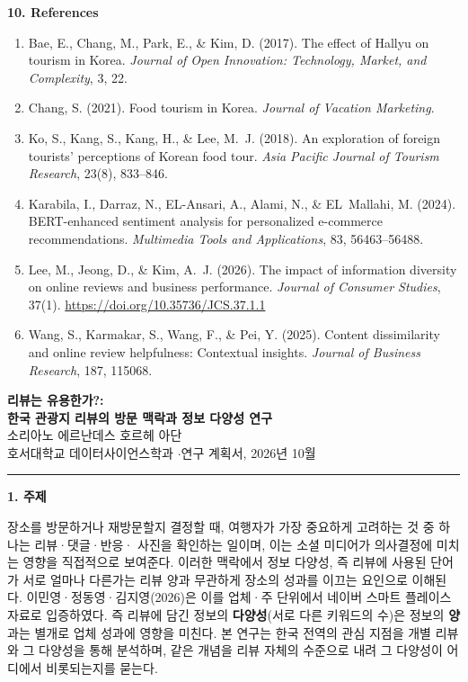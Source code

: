 \documentclass[10pt,a4paper]{article}
\newcommand{\headrule}{\vspace{1pt}\noindent\rule{\linewidth}{0.4pt}\vspace{1pt}}
\newcommand{\sect}[1]{\vspace{3pt}\noindent\textbf{#1}\par\vspace{1pt}}
\begin{document}
\sect{10. References}
\begin{enumerate}\small
  \item Bae, E., Chang, M., Park, E., \& Kim, D. (2017). The effect of Hallyu on tourism in Korea. \textit{Journal of Open Innovation: Technology, Market, and Complexity}, 3, 22.
  \item Chang, S. (2021). Food tourism in Korea. \textit{Journal of Vacation Marketing}.
  \item Ko, S., Kang, S., Kang, H., \& Lee, M.~J. (2018). An exploration of foreign tourists' perceptions of Korean food tour. \textit{Asia Pacific Journal of Tourism Research}, 23(8), 833--846.
  \item Karabila, I., Darraz, N., EL-Ansari, A., Alami, N., \& EL~Mallahi, M. (2024). BERT-enhanced sentiment analysis for personalized e-commerce recommendations. \textit{Multimedia Tools and Applications}, 83, 56463--56488.
  \item Lee, M., Jeong, D., \& Kim, A.~J. (2026). The impact of information diversity on online reviews and business performance. \textit{Journal of Consumer Studies}, 37(1). \url{https://doi.org/10.35736/JCS.37.1.1}
  \item Wang, S., Karmakar, S., Wang, F., \& Pei, Y. (2025). Content dissimilarity and online review helpfulness: Contextual insights. \textit{Journal of Business Research}, 187, 115068.
\end{enumerate}

\clearpage
\setcounter{table}{0}   %

\begin{center}
{\large\textbf{리뷰는 유용한가?:}}\\[2pt]
{\large\textbf{한국 관광지 리뷰의 방문 맥락과 정보 다양성 연구}}\\[5pt]
{\normalsize 소리아노 에르난데스 호르헤 아단}\\
{\small 호서대학교 데이터사이언스학과 \quad$\cdot$\quad 연구 계획서, 2026년 10월}
\end{center}



\headrule

\sect{1. 주제}
장소를 방문하거나 재방문할지 결정할 때, 여행자가 가장 중요하게 고려하는 것 중 하나는 리뷰·댓글·반응·
사진을 확인하는 일이며, 이는 소셜 미디어가 의사결정에 미치는 영향을 직접적으로 보여준다. 이러한
맥락에서 정보 다양성, 즉 리뷰에 사용된 단어가 서로 얼마나 다른가는 리뷰 양과 무관하게 장소의 성과를
이끄는 요인으로 이해된다. 이민영·정동영·김지영(2026)은 이를 업체·주 단위에서 네이버 스마트 플레이스
자료로 입증하였다. 즉 리뷰에 담긴 정보의 \textbf{다양성}(서로 다른 키워드의 수)은 정보의 \textbf{양}과는
별개로 업체 성과에 영향을 미친다. 본 연구는 한국 전역의 관심 지점을 개별 리뷰와 그 다양성을 통해
분석하며, 같은 개념을 리뷰 자체의 수준으로 내려 그 다양성이 어디에서 비롯되는지를 묻는다.
\end{document}
